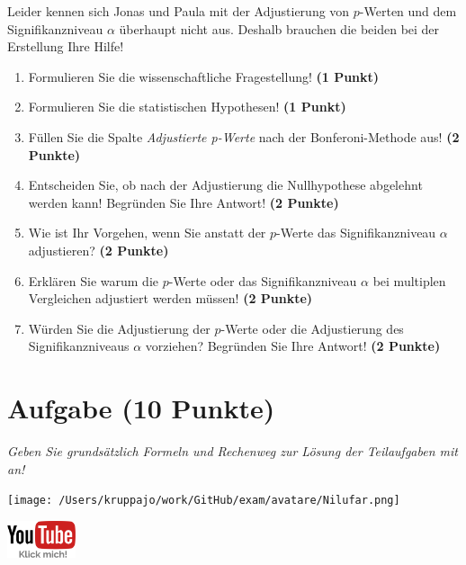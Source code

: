 \documentclass[a4paper, 9pt]{scrartcl}\usepackage[]{graphicx}\usepackage[]{xcolor}
\begin{document}
Leider kennen sich Jonas und Paula mit der Adjustierung von $p$-Werten und dem Signifikanzniveau $\alpha$ überhaupt nicht aus. Deshalb brauchen die beiden bei der Erstellung Ihre Hilfe!

\begin{enumerate}
  \item Formulieren Sie die wissenschaftliche Fragestellung! \textbf{(1 Punkt)}
  \item Formulieren Sie die statistischen Hypothesen! \textbf{(1 Punkt)}
\item Füllen Sie die Spalte \textit{Adjustierte p-Werte} nach der Bonferoni-Methode aus! \textbf{(2 Punkte)}
\item Entscheiden Sie, ob nach der Adjustierung die Nullhypothese abgelehnt werden kann! Begründen Sie Ihre Antwort! \textbf{(2 Punkte)}
\item Wie ist Ihr Vorgehen, wenn Sie anstatt der $p$-Werte das Signifikanzniveau $\alpha$ adjustieren? \textbf{(2 Punkte)}
\item Erklären Sie warum die $p$-Werte oder das Signifikanzniveau $\alpha$ bei multiplen Vergleichen adjustiert werden müssen! \textbf{(2 Punkte)}
\item Würden Sie die Adjustierung der $p$-Werte oder die Adjustierung des Signifikanzniveaus $\alpha$ vorziehen? Begründen Sie Ihre Antwort! \textbf{(2 Punkte)}
\end{enumerate}


 
\clearpage

\section{Aufgabe \hfill (10 Punkte)}

\textit{Geben Sie grundsätzlich Formeln und Rechenweg zur Lösung der Teilaufgaben mit an!} \\[1Ex]
 

 
\begin{minipage}[t]{0.5\textwidth}
\texttt{[image: /Users/kruppajo/work/GitHub/exam/avatare/Nilufar.png]}
\end{minipage}
\begin{minipage}[t]{0.5\textwidth}
\hfill
\href{https://youtu.be/xq29O8qDrg0}{\includegraphics[width = 2cm]{img/youtube}}
\end{minipage}
\vspace{-3ex}
\end{document}
